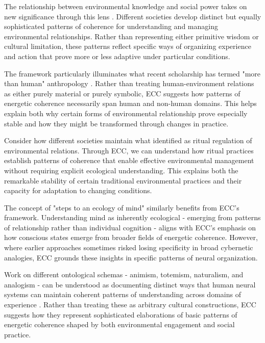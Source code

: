 \begin{refsection}
The relationship between environmental knowledge and social power takes on new significance through this lens \cite{tsing2015mushroom}. Different societies develop distinct but equally sophisticated patterns of coherence for understanding and managing environmental relationships. Rather than representing either primitive wisdom or cultural limitation, these patterns reflect specific ways of organizing experience and action that prove more or less adaptive under particular conditions.

The framework particularly illuminates what recent scholarship has termed "more than human" anthropology \cite{kohn2013forests}. Rather than treating human-environment relations as either purely material or purely symbolic, ECC suggests how patterns of energetic coherence necessarily span human and non-human domains. This helps explain both why certain forms of environmental relationship prove especially stable and how they might be transformed through changes in practice.

Consider how different societies maintain what \cite{rappaport1984pigs} identified as ritual regulation of environmental relations. Through ECC, we can understand how ritual practices establish patterns of coherence that enable effective environmental management without requiring explicit ecological understanding. This explains both the remarkable stability of certain traditional environmental practices and their capacity for adaptation to changing conditions.

The concept of "steps to an ecology of mind" \cite{bateson1972steps} similarly benefits from ECC's framework. Understanding mind as inherently ecological - emerging from patterns of relationship rather than individual cognition - aligns with ECC's emphasis on how conscious states emerge from broader fields of energetic coherence. However, where earlier approaches sometimes risked losing specificity in broad cybernetic analogies, ECC grounds these insights in specific patterns of neural organization.

Work on different ontological schemas - animism, totemism, naturalism, and analogism - can be understood as documenting distinct ways that human neural systems can maintain coherent patterns of understanding across domains of experience \cite{descola2013beyond}. Rather than treating these as arbitrary cultural constructions, ECC suggests how they represent sophisticated elaborations of basic patterns of energetic coherence shaped by both environmental engagement and social practice.


\end{refsection}
